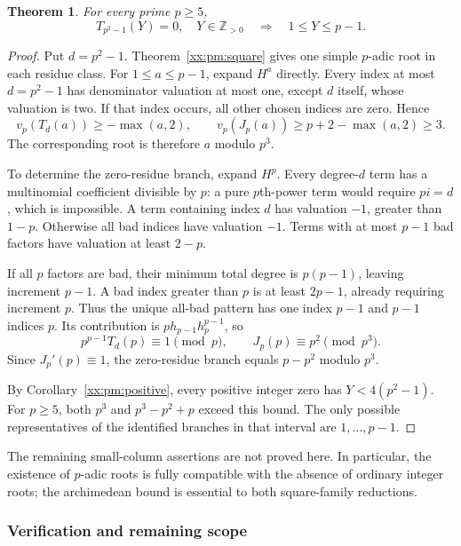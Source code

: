 \documentclass[11pt,a4paper]{article}
\numberwithin{equation}{section}
\newtheorem{theorem}{Theorem}[section]
\theoremstyle{definition}
\theoremstyle{remark}
\theoremstyle{plain}
\newcommand{\Z}{\mathbb Z}
\begin{document}
\begin{theorem}\label{xx:st:prime-square-reduction}
For every prime $p\ge5$,
\[
 T_{p^2-1}(Y)=0,\quad Y\in\Z_{>0}
 \quad\Longrightarrow\quad 1\le Y\le p-1.
\]
\end{theorem}
\begin{proof}
Put $d=p^2-1$.  Theorem~\ref{xx:pm:square} gives one simple $p$-adic root in
each residue class. For $1\le a\le p-1$, expand $H^a$ directly. Every index at
most $d=p^2-1$ has denominator valuation at most one, except $d$ itself, whose
valuation is two. If that index occurs, all other chosen indices are zero.
Hence
\[
 v_p(T_d(a))\ge-\max(a,2),\qquad
 v_p(J_p(a))\ge p+2-\max(a,2)\ge3.
\]
The corresponding root is therefore $a$ modulo $p^3$.

To determine the zero-residue branch, expand $H^p$. Every degree-$d$ term has a
multinomial coefficient divisible by $p$: a pure $p$th-power term would require
$pi=d$, which is impossible. A term containing index $d$ has valuation $-1$,
greater than $1-p$. Otherwise all bad indices have valuation $-1$. Terms with at
most $p-1$ bad factors have valuation at least $2-p$.

If all $p$ factors are bad, their minimum total degree is $p(p-1)$, leaving
increment $p-1$. A bad index greater than $p$ is at least $2p-1$, already
requiring increment $p$. Thus the unique all-bad pattern has one index $p-1$ and
$p-1$ indices $p$. Its contribution is $p h_{p-1}h_p^{p-1}$, so
\[
 p^{p-1}T_d(p)\equiv1\pmod p,\qquad
 J_p(p)\equiv p^2\pmod{p^3}.
\]
Since $J_p'(p)\equiv1$, the zero-residue branch equals $p-p^2$ modulo $p^3$.

By Corollary~\ref{xx:pm:positive}, every positive integer zero has
$Y<4(p^2-1)$. For $p\ge5$, both $p^3$ and $p^3-p^2+p$ exceed this bound. The
only possible representatives of the identified branches in that interval are
$1,\ldots,p-1$.
\end{proof}

The remaining small-column assertions are not proved here. In particular, the
existence of $p$-adic roots is fully compatible with the absence of ordinary
integer roots; the archimedean bound is essential to both square-family
reductions.

\subsubsection{Verification and remaining scope}
\end{document}
